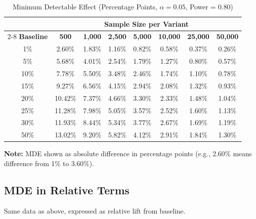 \begin{table}[h]
\centering
\caption{Minimum Detectable Effect (Percentage Points, $\alpha = 0.05$, Power = 0.80)}
\begin{tabular}{c|ccccccc}
\toprule
& \multicolumn{7}{c}{\textbf{Sample Size per Variant}} \\
\cmidrule{2-8}
\textbf{Baseline} & \textbf{500} & \textbf{1,000} & \textbf{2,500} & \textbf{5,000} & \textbf{10,000} & \textbf{25,000} & \textbf{50,000} \\
\midrule
1\% & 2.60\% & 1.83\% & 1.16\% & 0.82\% & 0.58\% & 0.37\% & 0.26\% \\
5\% & 5.68\% & 4.01\% & 2.54\% & 1.79\% & 1.27\% & 0.80\% & 0.57\% \\
10\% & 7.78\% & 5.50\% & 3.48\% & 2.46\% & 1.74\% & 1.10\% & 0.78\% \\
15\% & 9.27\% & 6.56\% & 4.15\% & 2.94\% & 2.08\% & 1.32\% & 0.93\% \\
20\% & 10.42\% & 7.37\% & 4.66\% & 3.30\% & 2.33\% & 1.48\% & 1.04\% \\
25\% & 11.28\% & 7.98\% & 5.05\% & 3.57\% & 2.52\% & 1.60\% & 1.13\% \\
30\% & 11.93\% & 8.44\% & 5.34\% & 3.77\% & 2.67\% & 1.69\% & 1.19\% \\
50\% & 13.02\% & 9.20\% & 5.82\% & 4.12\% & 2.91\% & 1.84\% & 1.30\% \\
\bottomrule
\end{tabular}
\end{table}

\textbf{Note:} MDE shown as absolute difference in percentage points (e.g., 2.60\% means difference from 1\% to 3.60\%).

\subsection{MDE in Relative Terms}

Same data as above, expressed as relative lift from baseline.

